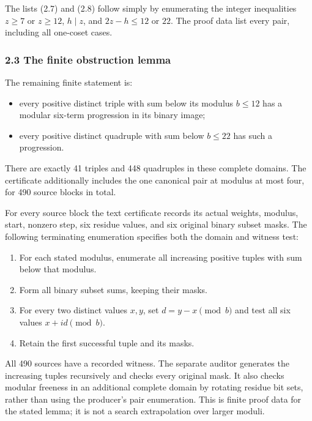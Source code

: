 \documentclass[11pt,a4paper]{article}
\begin{document}
The lists (2.7) and (2.8) follow simply by enumerating the integer inequalities \(z\ge7\) or \(z\ge12\), \(h\mid z\), and \(2z-h\le12\) or \(22\). The proof data list every pair, including all one-coset cases.

\subsubsection{2.3 The finite obstruction lemma}\label{eporig:the-finite-obstruction-lemma}

The remaining finite statement is:

\begin{itemize}
\tightlist
\item
  every positive distinct triple with sum below its modulus \(b\le12\) has a modular six-term progression in its binary image;
\item
  every positive distinct quadruple with sum below \(b\le22\) has such a progression.
\end{itemize}

There are exactly 41 triples and 448 quadruples in these complete domains. The certificate additionally includes the one canonical pair at modulus at most four, for 490 source blocks in total.

For every source block the text certificate records its actual weights, modulus, start, nonzero step, six residue values, and six original binary subset masks. The following terminating enumeration specifies both the domain and witness test:

\begin{enumerate}
\def\labelenumi{\arabic{enumi}.}
\tightlist
\item
  For each stated modulus, enumerate all increasing positive tuples with sum below that modulus.
\item
  Form all binary subset sums, keeping their masks.
\item
  For every two distinct values \(x,y\), set \(d=y-x\pmod b\) and test all six values \(x+id\pmod b\).
\item
  Retain the first successful tuple and its masks.
\end{enumerate}

All 490 sources have a recorded witness. The separate auditor generates the increasing tuples recursively and checks every original mask. It also checks modular freeness in an additional complete domain by rotating residue bit sets, rather than using the producer's pair enumeration. This is finite proof data for the stated lemma; it is not a search extrapolation over larger moduli.
\end{document}
